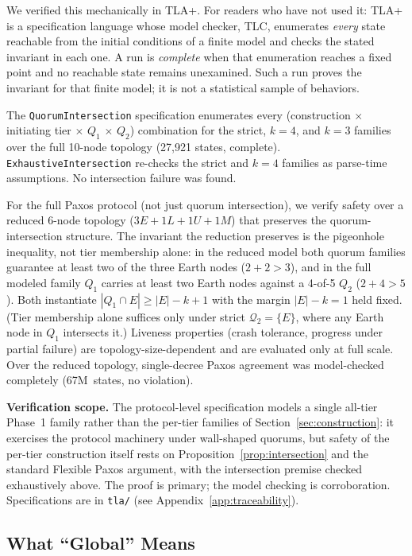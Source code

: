 \documentclass[letterpaper,twocolumn,10pt]{article}
\newcounter{prop}
\newcounter{cor}
\begin{document}
We verified this mechanically in TLA+. For readers who have not used it: TLA+ is a specification language whose model checker, TLC, enumerates \emph{every} state reachable from the initial conditions of a finite model and checks the stated invariant in each one. A run is \emph{complete} when that enumeration reaches a fixed point and no reachable state remains unexamined. Such a run proves the invariant for that finite model; it is not a statistical sample of behaviors.

The \texttt{QuorumIntersection} specification enumerates every (construction $\times$ initiating tier $\times$ $Q_1$ $\times$ $Q_2$) combination for the strict, $k{=}4$, and $k{=}3$ families over the full 10-node topology (27{,}921 states, complete). \texttt{ExhaustiveIntersection} re-checks the strict and $k{=}4$ families as parse-time assumptions. No intersection failure was found.

For the full Paxos protocol (not just quorum intersection), we verify safety over a reduced 6-node topology ($3E + 1L + 1U + 1M$) that preserves the quorum-intersection structure. The invariant the reduction preserves is the pigeonhole inequality, not tier membership alone: in the reduced model both quorum families guarantee at least two of the three Earth nodes ($2 + 2 > 3$), and in the full modeled family $Q_1$ carries at least two Earth nodes against a 4-of-5 $Q_2$ ($2 + 4 > 5$). Both instantiate $|Q_1 \cap E| \ge |E| - k + 1$ with the margin $|E| - k = 1$ held fixed. (Tier membership alone suffices only under strict $\mathcal{Q}_2 = \{E\}$, where any Earth node in $Q_1$ intersects it.) Liveness properties (crash tolerance, progress under partial failure) are topology-size-dependent and are evaluated only at full scale. Over the reduced topology, single-decree Paxos agreement was model-checked completely (67M~states, no violation).

\textbf{Verification scope.} The protocol-level specification models a single all-tier Phase~1 family rather than the per-tier families of Section~\ref{sec:construction}: it exercises the protocol machinery under wall-shaped quorums, but safety of the per-tier construction itself rests on Proposition~\ref{prop:intersection} and the standard Flexible Paxos argument, with the intersection premise checked exhaustively above. The proof is primary; the model checking is corroboration. Specifications are in \texttt{tla/} (see Appendix~\ref{app:traceability}).

\subsection{What ``Global'' Means}
\end{document}
